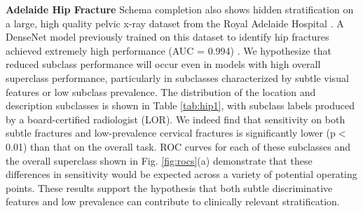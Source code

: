 \documentclass[sigconf,anonymous,review]{acmart}
\begin{document}

\textbf{Adelaide Hip Fracture} Schema completion also shows hidden stratification on a large, high quality pelvic x-ray dataset from the Royal Adelaide Hospital \citep{Gale_W_Oakden-Rayner_L_Carneiro_G_Bradley_AP_Palmer_LJ2017-tl}.
 A DenseNet model previously trained on this dataset to identify hip fractures achieved extremely high performance (AUC = 0.994) \citep{Gale_W_Oakden-Rayner_L_Carneiro_G_Bradley_AP_Palmer_LJ2017-tl}. 
  We hypothesize that reduced subclass performance will occur even in models with high overall superclass performance, particularly in subclasses characterized by subtle visual features or low subclass prevalence.  
 The distribution of the location and description subclasses is shown in Table \ref{tab:hip1}, with subclass labels produced by a board-certified radiologist (LOR).  
 We indeed find that sensitivity on both subtle fractures and low-prevalence cervical fractures is significantly lower (p$<$0.01) than that on the overall task. 
ROC curves for each of these subclasses and the overall superclass shown in Fig. \ref{fig:rocs}(a) demonstrate that these differences in sensitivity would be expected across a variety of potential operating points. 
These results support the hypothesis that both subtle discriminative features and low prevalence can contribute to clinically relevant stratification. 

 
\end{document}

